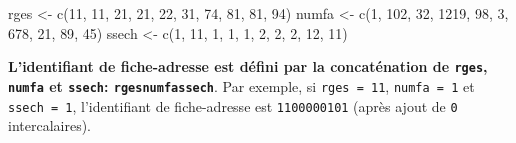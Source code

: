 \documentclass[12pt,twosided, notitlepage]{book}
\newenvironment{Shaded}{}{}
\newcommand{\KeywordTok}[1]{\textcolor[rgb]{0.00,0.00,1.00}{{#1}}}
\newcommand{\DecValTok}[1]{{#1}}
\newcommand{\StringTok}[1]{\textcolor[rgb]{0.00,0.50,0.50}{{#1}}}
\newcommand{\NormalTok}[1]{{#1}}
\renewenvironment{Shaded}{\begin{snugshade}}{\end{snugshade}}
\begin{document}
\begin{Shaded}
\begin{Highlighting}[]
\NormalTok{rges <-}\StringTok{ }\KeywordTok{c}\NormalTok{(}\DecValTok{11}\NormalTok{, }\DecValTok{11}\NormalTok{, }\DecValTok{21}\NormalTok{, }\DecValTok{21}\NormalTok{, }\DecValTok{22}\NormalTok{, }\DecValTok{31}\NormalTok{, }\DecValTok{74}\NormalTok{, }\DecValTok{81}\NormalTok{, }\DecValTok{81}\NormalTok{, }\DecValTok{94}\NormalTok{)}
\NormalTok{numfa <-}\StringTok{ }\KeywordTok{c}\NormalTok{(}\DecValTok{1}\NormalTok{, }\DecValTok{102}\NormalTok{, }\DecValTok{32}\NormalTok{, }\DecValTok{1219}\NormalTok{, }\DecValTok{98}\NormalTok{, }\DecValTok{3}\NormalTok{, }\DecValTok{678}\NormalTok{, }\DecValTok{21}\NormalTok{, }\DecValTok{89}\NormalTok{, }\DecValTok{45}\NormalTok{)}
\NormalTok{ssech <-}\StringTok{ }\KeywordTok{c}\NormalTok{(}\DecValTok{1}\NormalTok{, }\DecValTok{11}\NormalTok{, }\DecValTok{1}\NormalTok{, }\DecValTok{1}\NormalTok{, }\DecValTok{1}\NormalTok{, }\DecValTok{2}\NormalTok{, }\DecValTok{2}\NormalTok{, }\DecValTok{2}\NormalTok{, }\DecValTok{12}\NormalTok{, }\DecValTok{11}\NormalTok{)}
\end{Highlighting}
\end{Shaded}

\textbf{L'identifiant de fiche-adresse est défini par la concaténation
de \texttt{rges}, \texttt{numfa} et \texttt{ssech}:
\texttt{rges\textbar{}\textbar{}numfa\textbar{}\textbar{}ssech}}. Par
exemple, si \texttt{rges\ =\ 11}, \texttt{numfa\ =\ 1} et
\texttt{ssech\ =\ 1}, l'identifiant de fiche-adresse est
\texttt{1100000101} (après ajout de \texttt{0} intercalaires).
\end{document}
